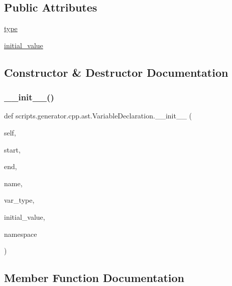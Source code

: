 \subsection*{Public Attributes}
\begin{DoxyCompactItemize}
\item 
\mbox{\hyperlink{classscripts_1_1generator_1_1cpp_1_1ast_1_1_variable_declaration_a9efbfeeb6bb2d37f3c0a0f5b36f9f4a0}{type}}
\item 
\mbox{\hyperlink{classscripts_1_1generator_1_1cpp_1_1ast_1_1_variable_declaration_aa79935e3c703c4cf5a542c1c7cf7a6a8}{initial\+\_\+value}}
\end{DoxyCompactItemize}


\subsection{Constructor \& Destructor Documentation}
\mbox{\label{classscripts_1_1generator_1_1cpp_1_1ast_1_1_variable_declaration_af49fb5941fcdee8afbb5ce7580519610}} 
\subsubsection{\texorpdfstring{\_\_init\_\_()}{\_\_init\_\_()}}
{\footnotesize\ttfamily def scripts.\+generator.\+cpp.\+ast.\+Variable\+Declaration.\+\_\+\+\_\+init\+\_\+\+\_\+ (\begin{DoxyParamCaption}\item[{}]{self,  }\item[{}]{start,  }\item[{}]{end,  }\item[{}]{name,  }\item[{}]{var\+\_\+type,  }\item[{}]{initial\+\_\+value,  }\item[{}]{namespace }\end{DoxyParamCaption})}



\subsection{Member Function Documentation}
\mbox{\label{classscripts_1_1generator_1_1cpp_1_1ast_1_1_variable_declaration_a6cfba922c97fcb4673bcb2478b8c3a90}} 

